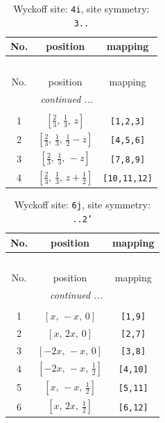 \documentclass[fleqn,8pt]{jsarticle}
\begin{document}
\renewcommand{\arraystretch}{1.2}
\begin{longtable}{ccc}
\caption{Wyckoff site: {\tt 4i}, site symmetry: {\tt 3..}}
 \\
 \hline \hline
No. & position & mapping \\ \hline \endfirsthead

\multicolumn{2}{l}{\tablename\ \thetable{}} \\
 \hline \hline
No. & position & mapping \\ \hline \endhead

 \hline \hline
\multicolumn{2}{r}{\footnotesize\it continued ...} \\ \endfoot

 \hline \hline
\multicolumn{2}{r}{} \\ \endlastfoot

1 & $\left[ \frac{2}{3},\, \frac{1}{3},\, z \right]$ & {\tt [1,2,3]} \\ \hline
2 & $\left[ \frac{2}{3},\, \frac{1}{3},\, \frac{1}{2} - z \right]$ & {\tt [4,5,6]} \\ \hline
3 & $\left[ \frac{2}{3},\, \frac{1}{3},\, - z \right]$ & {\tt [7,8,9]} \\ \hline
4 & $\left[ \frac{2}{3},\, \frac{1}{3},\, z + \frac{1}{2} \right]$ & {\tt [10,11,12]} \\
\end{longtable}
\renewcommand{\arraystretch}{1.2}
\begin{longtable}{ccc}
\caption{Wyckoff site: {\tt 6j}, site symmetry: {\tt ..2'}}
 \\
 \hline \hline
No. & position & mapping \\ \hline \endfirsthead

\multicolumn{2}{l}{\tablename\ \thetable{}} \\
 \hline \hline
No. & position & mapping \\ \hline \endhead

 \hline \hline
\multicolumn{2}{r}{\footnotesize\it continued ...} \\ \endfoot

 \hline \hline
\multicolumn{2}{r}{} \\ \endlastfoot

1 & $\left[ x,\, - x,\, 0 \right]$ & {\tt [1,9]} \\ \hline
2 & $\left[ x,\, 2 x,\, 0 \right]$ & {\tt [2,7]} \\ \hline
3 & $\left[ - 2 x,\, - x,\, 0 \right]$ & {\tt [3,8]} \\ \hline
4 & $\left[ - 2 x,\, - x,\, \frac{1}{2} \right]$ & {\tt [4,10]} \\ \hline
5 & $\left[ x,\, - x,\, \frac{1}{2} \right]$ & {\tt [5,11]} \\ \hline
6 & $\left[ x,\, 2 x,\, \frac{1}{2} \right]$ & {\tt [6,12]} \\
\end{longtable}
\end{document}
